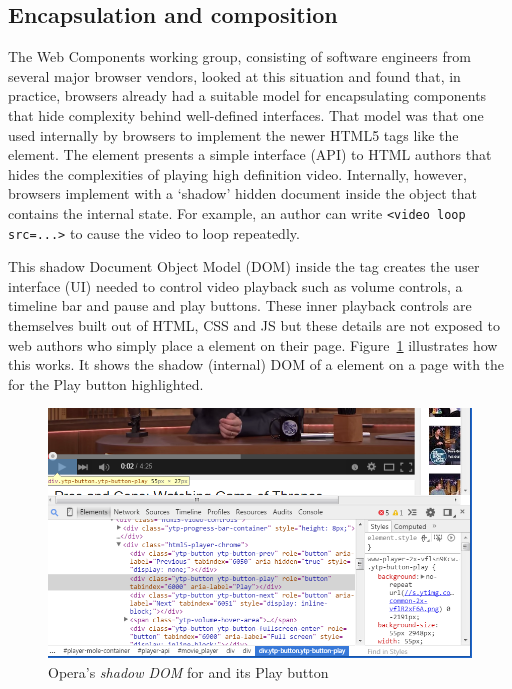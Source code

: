 \subsection{Encapsulation and composition}

The Web Components working group, consisting of software engineers from several major browser vendors, looked at this situation and found that, in practice, browsers already had a suitable model for encapsulating components that hide complexity behind well-defined interfaces.
That model was that one used internally by browsers to implement the newer HTML5 tags like the \textbf{} element. 
The  element presents a simple interface (API) to HTML authors that hides the complexities of playing high definition video.
Internally, however, browsers implement  with a `shadow' hidden document inside the object that contains the internal state. 
For example, an author can write \texttt{<video loop src=...>} to cause the video to loop repeatedly.

This shadow Document Object Model (DOM) inside the  tag creates the user interface (UI) needed to control video playback such as volume controls, a timeline bar and pause and play buttons.
These inner playback controls are themselves built out of HTML, CSS and JS but these details are not exposed to web authors who simply place a  element on their page. 
Figure~\ref{f:html5video} illustrates how this works. It shows the shadow (internal) DOM of a  element on a page with the  for the Play button highlighted.

% 
\begin{figure}[htb]
\centering
 \includegraphics[width=5.5in]{images/html5_video_control.png}
\caption{Opera's \textit{shadow DOM} for  and its Play button}
\label{f:html5video}
\end{figure}
%

